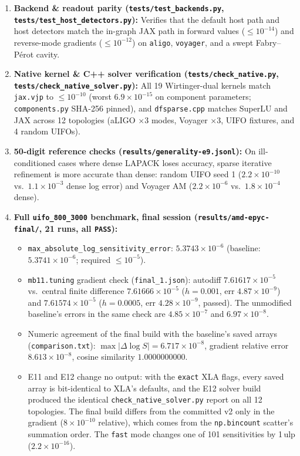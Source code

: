 \documentclass[11pt,a4paper]{article}
\begin{document}
\begin{enumerate}[leftmargin=1.6em,itemsep=2pt]
    \item \textbf{Backend \& readout parity (\texttt{tests/test\_backends.py}, \texttt{tests/test\_host\_detectors.py}):} Verifies that the default host path and host detectors match the in-graph JAX path in forward values ($\le 10^{-14}$) and reverse-mode gradients ($\le 10^{-12}$) on \texttt{aligo}, \texttt{voyager}, and a swept Fabry--P\'erot cavity.
    \item \textbf{Native kernel \& C++ solver verification (\texttt{tests/check\_native.py}, \texttt{tests/check\_native\_solver.py}):} All 19 Wirtinger-dual kernels match \texttt{jax.vjp} to $\le 10^{-10}$ (worst $6.9\times 10^{-15}$ on component parameters; \texttt{components.py} SHA-256 pinned), and \texttt{dfsparse.cpp} matches SuperLU and JAX across 12 topologies (aLIGO $\times 3$ modes, Voyager $\times 3$, UIFO fixtures, and 4 random UIFOs).
    \item \textbf{50-digit reference checks (\texttt{results/generality-e9.jsonl}):} On ill-conditioned cases where dense LAPACK loses accuracy, sparse iterative refinement is more accurate than dense: random UIFO seed 1 ($2.2\times 10^{-10}$ vs.\ $1.1\times 10^{-3}$ dense log error) and Voyager AM ($2.2\times 10^{-6}$ vs.\ $1.8\times 10^{-4}$ dense).
    \item \textbf{Full \texttt{uifo\_800\_3000} benchmark, final session (\texttt{results/amd-epyc-final/}, 21 runs, all \texttt{PASS}):}
    \begin{itemize}[leftmargin=1.2em,itemsep=1pt]
        \item \texttt{max\_absolute\_log\_sensitivity\_error}: $5.3743\times 10^{-6}$ (baseline: $5.3741\times 10^{-6}$; required $\le 10^{-5}$).
        \item \texttt{mb11.tuning} gradient check (\texttt{final\_1.json}): autodiff $7.61617\times 10^{-5}$ vs.\ central finite difference $7.61666\times 10^{-5}$ ($h=0.001$, err $4.87\times 10^{-9}$) and $7.61574\times 10^{-5}$ ($h=0.0005$, err $4.28\times 10^{-9}$, passed). The unmodified baseline's errors in the same check are $4.85\times 10^{-7}$ and $6.97\times 10^{-8}$.
        \item Numeric agreement of the final build with the baseline's saved arrays (\texttt{comparison.txt}): $\max|\Delta\log S| = 6.717\times 10^{-8}$, gradient relative error $8.613\times 10^{-8}$, cosine similarity $1.0000000000$.
        \item E11 and E12 change no output: with the \texttt{exact} XLA flags, every saved array is bit-identical to XLA's defaults, and the E12 solver build produced the identical \texttt{check\_native\_solver.py} report on all 12 topologies. The final build differs from the committed v2 only in the gradient ($8\times 10^{-10}$ relative), which comes from the \texttt{np.bincount} scatter's summation order. The \texttt{fast} mode changes one of 101 sensitivities by 1\,ulp ($2.2\times 10^{-16}$).
    \end{itemize}
\end{enumerate}
\end{document}
